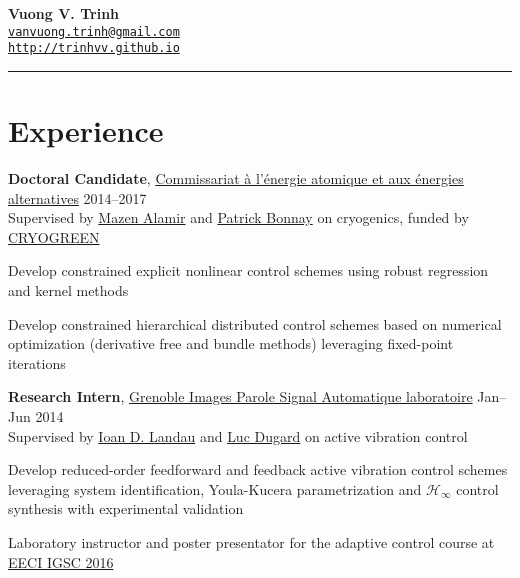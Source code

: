 \documentclass[a4paper,11pt]{article}
\begin{document}
 {\hspace*{-\marginparsep minus \marginparwidth}%
\begin{minipage}[t]{\textwidth+\marginparwidth+\marginparsep}%
\centering
{\LARGE \bfseries {Vuong V. Trinh}}\\
\vspace{0.2cm}
\href{mailto:vanvuong.trinh@gmail.com}{\texttt{vanvuong.trinh@gmail.com}} \\
\href{https://trinhvv.github.io}{\texttt{http://trinhvv.github.io}}
\rule{\columnwidth}{1.2pt}
\end{minipage}}
 
 \vspace{0.2cm}


\section{Experience}

\textbf{Doctoral Candidate},
\href{http://www.cea.fr/}{Commissariat \`{a} l'\'{e}nergie atomique et aux \'{e}nergies alternatives}
\hfill {2014--2017}\\
Supervised by \href{http://www.mazenalamir.fr/}{Mazen Alamir} and \href{http://www.researchgate.net/profile/P_Bonnay}{Patrick Bonnay} on cryogenics, funded by \href{http://www.agence-nationale-recherche.fr/Project-ANR-13-SEED-0005}{CRYOGREEN}
\begin{innerlist}
\item Develop constrained explicit nonlinear control schemes using robust regression and kernel methods
\item Develop constrained hierarchical distributed control schemes based on numerical optimization (derivative free and bundle methods) leveraging fixed-point iterations
\end{innerlist}

\vspace{0.1cm}

\textbf{Research Intern},
\href{http://www.gipsa-lab.fr/}{Grenoble Images Parole Signal Automatique laboratoire}
\hfill {Jan--Jun 2014}\\
Supervised by \href{http://www.gipsa-lab.grenoble-inp.fr/~ioandore.landau/}{Ioan D. Landau} and \href{http://www.researchgate.net/profile/Luc_Dugard/}{Luc Dugard} on active vibration control
\begin{innerlist}
\item Develop reduced-order feedforward and feedback active vibration control schemes leveraging system identification, Youla-Kucera parametrization and $\mathcal{H}_{\infty}$ control synthesis with experimental validation
\item  Laboratory instructor and poster presentator for the adaptive control course at \href{http://www.eeci-igsc.eu/}{EECI IGSC 2016}
\end{innerlist}
\end{document}
